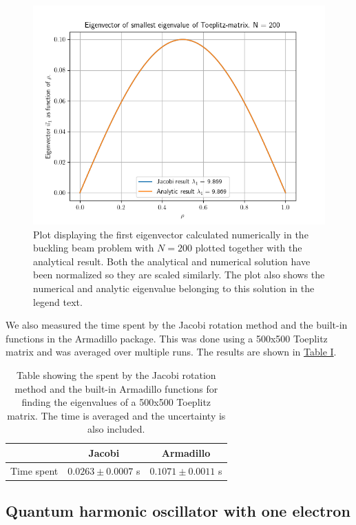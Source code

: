 \documentclass[reprint,english,notitlepage]{revtex4-1}  %
\begin{document}
\begin{figure}[h!] \label{fig:IV:a:1}
\includegraphics[scale=0.6]{toeplitz.png}
\caption{Plot displaying the first eigenvector calculated numerically in the buckling beam problem with $N=200$ plotted together with the analytical result. Both the analytical and numerical solution have been normalized so they are scaled similarly. The plot also shows the numerical and analytic eigenvalue belonging to this solution in the legend text.}
\end{figure}

We also measured the time spent by the Jacobi rotation method and the built-in functions in the Armadillo package. This was done using a 500x500 Toeplitz matrix and was averaged over multiple runs. The results are shown in \hyperref[table:IV:a:1]{Table I}.

\begin{table}[h!] \label{table:IV:a:1}
\caption{Table showing the spent by the Jacobi rotation method and the built-in Armadillo functions for finding the eigenvalues of a 500x500 Toeplitz matrix. The time is averaged and the uncertainty is also included.}
\begin{tabular}{|c|c|c|}
\hline
 & Jacobi & Armadillo \\
\hline
Time spent & $0.0263 \pm 0.0007$ s & $0.1071 \pm 0.0011$ s \\
\hline
\end{tabular}
\end{table}




\subsection{Quantum harmonic oscillator with one electron} \label{sec:IV:b}
\end{document}
